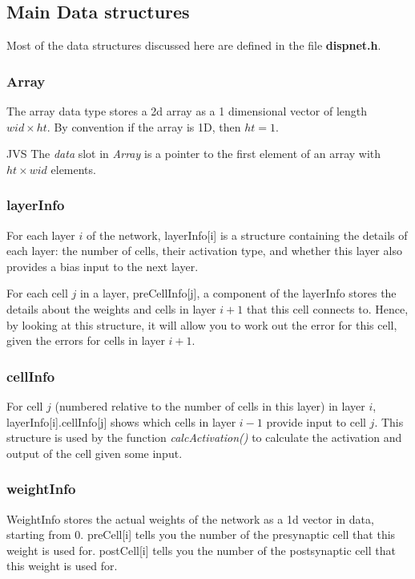\documentclass[a4paper]{article}
\begin{document}
\subsection{Main Data structures}

Most of the data structures discussed here are defined in the file 
{\bf dispnet.h}.

\subsubsection{Array}

The array data type stores a 2d  array as  a 1 dimensional vector of
length $wid \times ht$.  By convention if the array is 1D, then $ht = 1$.

JVS The {\em data} slot in {\em Array} is a pointer to the first element of an
array with $ht \times wid$ elements.

\subsubsection{layerInfo}

For each layer $i$ of the network, layerInfo[i] is a structure
containing the details of each layer: the number of cells, their
activation type, and whether this layer also provides a bias input to
the next layer.  

For each cell $j$ in a layer, preCellInfo[j], a component of the
layerInfo stores the details about the weights and cells in layer
$i+1$ that this cell connects to.  Hence, by looking at this
structure, it will allow you to work out the error for this cell,
given the errors for cells in layer $i+1$.

\subsubsection{cellInfo}

For cell $j$ (numbered relative to the number of cells in this layer)
in layer $i$, layerInfo[i].cellInfo[j] shows which cells in layer
$i-1$ provide input to cell $j$.  This structure is used by the
function {\em calcActivation()} to calculate the activation and output of
the cell given some input.

\subsubsection{weightInfo}

WeightInfo stores the actual weights of the network as a 1d vector in
data, starting from 0.   preCell[i] tells you the number of the
presynaptic cell that this weight is used for. postCell[i] tells you
the number of the postsynaptic cell that this weight is used for.
\end{document}

